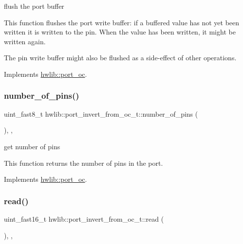 flush the port buffer

This function flushes the port write buffer\+: if a buffered value has not yet been written it is written to the pin. When the value has been written, it might be written again.

The pin write buffer might also be flushed as a side-\/effect of other operations. 

Implements \hyperlink{classhwlib_1_1port__oc_a49b64bd24431b35e92e208df84327dae}{hwlib\+::port\+\_\+oc}.

\mbox{\label{classhwlib_1_1port__invert__from__oc__t_aebb0d0486a6a31d075ee9e4467f3a7f6}} 
\subsubsection{\texorpdfstring{number\+\_\+of\+\_\+pins()}{number\_of\_pins()}}
{\footnotesize\ttfamily uint\+\_\+fast8\+\_\+t hwlib\+::port\+\_\+invert\+\_\+from\+\_\+oc\+\_\+t\+::number\+\_\+of\+\_\+pins (\begin{DoxyParamCaption}{ }\end{DoxyParamCaption})\hspace{0.3cm}{\ttfamily [inline]}, {\ttfamily [override]}, {\ttfamily [virtual]}}





get number of pins

This function returns the number of pins in the port. 

Implements \hyperlink{classhwlib_1_1port__oc_a44d0dbfde290ad17237ad70c09a4c402}{hwlib\+::port\+\_\+oc}.

\mbox{\label{classhwlib_1_1port__invert__from__oc__t_ab2ad571f994e23b53f86e9655541b10d}} 
\subsubsection{\texorpdfstring{read()}{read()}}
{\footnotesize\ttfamily uint\+\_\+fast16\+\_\+t hwlib\+::port\+\_\+invert\+\_\+from\+\_\+oc\+\_\+t\+::read (\begin{DoxyParamCaption}{ }\end{DoxyParamCaption})\hspace{0.3cm}{\ttfamily [inline]}, {\ttfamily [override]}, {\ttfamily [virtual]}}





